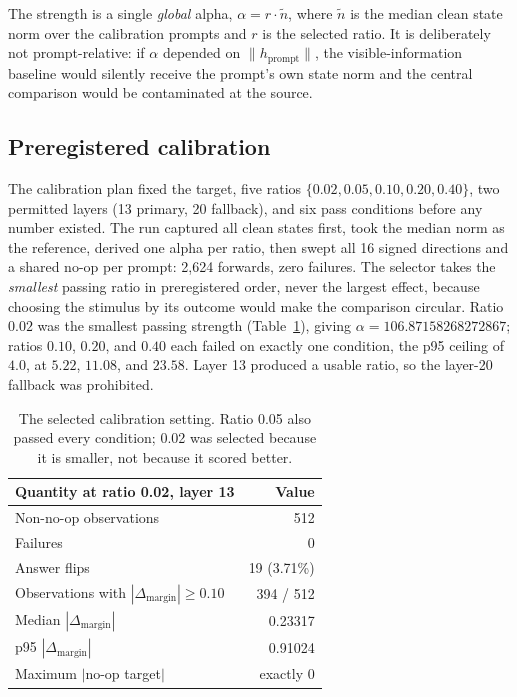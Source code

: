 \documentclass{article}
\begin{document}
The strength is a single \emph{global} alpha, $\alpha = r \cdot \tilde{n}$, where $\tilde{n}$ is
the median clean state norm over the calibration prompts and $r$ is the selected ratio. It is
deliberately not prompt-relative: if $\alpha$ depended on $\lVert h_{\text{prompt}} \rVert$, the
visible-information baseline would silently receive the prompt's own state norm and the central
comparison would be contaminated at the source.

\subsection{Preregistered calibration}

The calibration plan fixed the target, five ratios $\{0.02, 0.05, 0.10, 0.20, 0.40\}$, two permitted
layers (13 primary, 20 fallback), and six pass conditions before any number existed. The run
captured all clean states first, took the median norm as the reference, derived one alpha per ratio,
then swept all 16 signed directions and a shared no-op per prompt: 2{,}624 forwards, zero failures.
The selector takes the \emph{smallest} passing ratio in preregistered order, never the largest
effect, because choosing the stimulus by its outcome would make the comparison circular. Ratio
$0.02$ was the smallest passing strength (Table~\ref{tab:calibration}), giving
$\alpha = 106.87158268272867$; ratios $0.10$, $0.20$, and $0.40$ each failed on exactly one
condition, the p95 ceiling of $4.0$, at $5.22$, $11.08$, and $23.58$. Layer 13 produced a usable
ratio, so the layer-20 fallback was prohibited.

\begin{table}[htbp]
\centering
\small
\begin{tabular}{lr}
\toprule
Quantity at ratio 0.02, layer 13 & Value \\
\midrule
Non-no-op observations & 512 \\
Failures & 0 \\
Answer flips & 19 (3.71\%) \\
Observations with $|\Delta_{\text{margin}}| \geq 0.10$ & 394 / 512 \\
Median $|\Delta_{\text{margin}}|$ & 0.23317 \\
p95 $|\Delta_{\text{margin}}|$ & 0.91024 \\
Maximum $|$no-op target$|$ & exactly 0 \\
\bottomrule
\end{tabular}
\caption{The selected calibration setting. Ratio 0.05 also passed every condition; 0.02 was
selected because it is smaller, not because it scored better.}
\label{tab:calibration}
\end{table}
\end{document}
